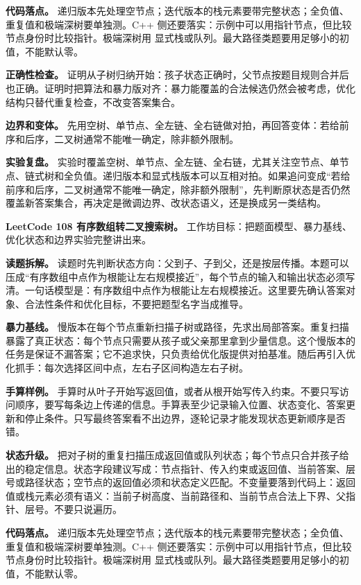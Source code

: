 \textbf{代码落点。} 递归版本先处理空节点；迭代版本的栈元素要带完整状态；全负值、重复值和极端深树要单独测。C++ 侧还要落实：示例中可以用指针节点，但比较节点身份时比较指针。极端深树用  显式栈或队列。最大路径类题要用足够小的初值，不能默认零。

\textbf{正确性检查。} 证明从子树归纳开始：孩子状态正确时，父节点按题目规则合并后也正确。证明时把算法和暴力版对齐：暴力能覆盖的合法候选仍然会被考虑，优化结构只替代重复检查，不改变答案集合。

\textbf{边界和变体。} 先用空树、单节点、全左链、全右链做对拍，再回答变体：若给前序和后序，二叉树通常不能唯一确定，除非额外限制。

\textbf{实验复盘。} 实验时覆盖空树、单节点、全左链、全右链，尤其关注空节点、单节点、链式树和全负值。递归版本和显式栈版本可以互相对拍。如果追问变成“若给前序和后序，二叉树通常不能唯一确定，除非额外限制”，先判断原状态是否仍然覆盖新答案集合，再决定是微调边界、改状态语义，还是换成另一类结构。

\noindent\textbf{LeetCode 108 有序数组转二叉搜索树。} 工作坊目标：把题面模型、暴力基线、优化状态和边界实验完整讲出来。

\textbf{读题拆解。} 读题时先判断状态方向：父到子、子到父，还是按层传播。本题可以压成“有序数组中点作为根能让左右规模接近”，每个节点的输入和输出状态必须写清。一句话模型是：有序数组中点作为根能让左右规模接近。这里要先确认答案对象、合法性条件和优化目标，不要把题型名字当成推导。

\textbf{暴力基线。} 慢版本在每个节点重新扫描子树或路径，先求出局部答案。重复扫描暴露了真正状态：每个节点只需要从孩子或父亲那里拿到少量信息。这个慢版本的任务是保证不漏答案；它不追求快，只负责给优化版提供对拍基准。随后再引入优化抓手：每次选择区间中点，左右子区间构造左右子树。

\textbf{手算样例。} 手算时从叶子开始写返回值，或者从根开始写传入约束。不要只写访问顺序，要写每条边上传递的信息。手算表至少记录输入位置、状态变化、答案更新和停止条件。只写最终答案看不出边界，逐轮记录才能发现状态更新顺序是否错。

\textbf{状态升级。} 把对子树的重复扫描压成返回值或队列状态；每个节点只合并孩子给出的稳定信息。状态字段建议写成：节点指针、传入约束或返回值、当前答案、层号或路径状态；空节点的返回值必须和状态定义匹配。不变量要落到代码上：返回值或栈元素必须有语义：当前子树高度、当前路径和、当前节点合法上下界、父指针、层号。不要只说遍历。

\textbf{代码落点。} 递归版本先处理空节点；迭代版本的栈元素要带完整状态；全负值、重复值和极端深树要单独测。C++ 侧还要落实：示例中可以用指针节点，但比较节点身份时比较指针。极端深树用  显式栈或队列。最大路径类题要用足够小的初值，不能默认零。

